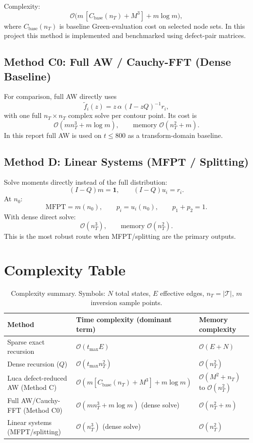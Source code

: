\documentclass[11pt,a4paper]{article}
\begin{document}
Complexity:
\[
\mathcal O\!\big(m\,[C_{\text{base}}(n_T)+M^3]+m\log m\big),
\]
where $C_{\text{base}}(n_T)$ is baseline Green-evaluation cost on selected node sets.
In this project this method is implemented and benchmarked using defect-pair matrices.

\subsection{Method C0: Full AW / Cauchy-FFT (Dense Baseline)}
For comparison, full AW directly uses
\[
\tilde f_i(z)=z\,\alpha\,(I-zQ)^{-1}r_i,
\]
with one full $n_T\times n_T$ complex solve per contour point.
Its cost is
\[
\mathcal O(mn_T^3 + m\log m),\qquad \text{memory } \mathcal O(n_T^2+m).
\]
In this report full AW is used on $t\le 800$ as a transform-domain baseline.

\subsection{Method D: Linear Systems (MFPT / Splitting)}
Solve moments directly instead of the full distribution:
\[
(I-Q)m=\mathbf 1,\qquad (I-Q)u_i=r_i.
\]
At $n_0$:
\[
\mathrm{MFPT}=m(n_0),\qquad p_i=u_i(n_0),\qquad p_1+p_2=1.
\]
With dense direct solve:
\[
\mathcal O(n_T^3),\qquad \text{memory } \mathcal O(n_T^2).
\]
This is the most robust route when MFPT/splitting are the primary outputs.

\section{Complexity Table}
\begin{table}[H]
  \centering
  \small
  \begin{tabular}{>{\raggedright\arraybackslash}p{3.3cm}>{\raggedright\arraybackslash}p{5.8cm}>{\raggedright\arraybackslash}p{3.8cm}}
    \toprule
    Method & Time complexity (dominant term) & Memory complexity \\
    \midrule
    Sparse exact recursion & $\mathcal O(t_{\max}E)$ & $\mathcal O(E+N)$ \\
    Dense recursion ($Q$) & $\mathcal O(t_{\max}n_T^2)$ & $\mathcal O(n_T^2)$ \\
    Luca defect-reduced AW (Method C) & $\mathcal O(m[C_{\text{base}}(n_T)+M^3]+m\log m)$ & $\mathcal O(M^2+n_T)$ to $\mathcal O(n_T^2)$ \\
    Full AW/Cauchy-FFT (Method C0) & $\mathcal O(mn_T^3 + m\log m)$ (dense solve) & $\mathcal O(n_T^2+m)$ \\
    Linear systems (MFPT/splitting) & $\mathcal O(n_T^3)$ (dense solve) & $\mathcal O(n_T^2)$ \\
    \bottomrule
  \end{tabular}
  \caption{Complexity summary. Symbols: $N$ total states, $E$ effective edges, $n_T=|\mathcal T|$, $m$ inversion sample points.}
\end{table}
\end{document}
